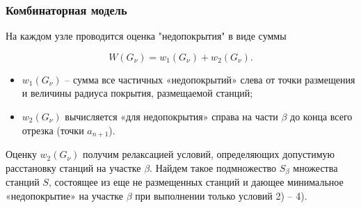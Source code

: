     


\begin{frame}
    \frametitle{Комбинаторная модель}
    \justifying
    На каждом узле проводится оценка "недопокрытия"  в виде суммы

    \begin{displaymath}
        W\left(G_\nu\right) = w_1\left(G_\nu \right) + w_2\left(G_\nu \right). 
    \end{displaymath}

    \begin{itemize}
        \item $w_1 \left(G_\nu \right)$ -- сумма все частичных «недопокрытий» слева от точки размещения и величины радиуса покрытия, размещаемой станций;
        \item $w_2 \left(G_\nu \right)$ вычисляется «для недопокрытия» справа на части $\beta$ до конца всего отрезка (точки $a_{n+1}$).
    \end{itemize}
    Оценку $w_2 \left(G_\nu \right)$ получим релаксацией условий, определяющих допустимую расстановку станций на участке $\beta$. Найдем такое подмножество $S_\beta$ множества станций $S$, состоящее из еще не размещенных станций и дающее минимальное «недопокрытие» на участке $\beta$ при выполнении только условий 2) – 4). 
    
\end{frame}

